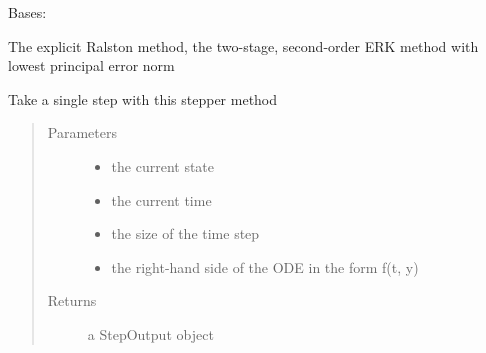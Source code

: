\documentclass[letterpaper,10pt,english]{sphinxmanual}
\begin{document}

\begin{fulllineitems}
\label{\detokenize{spitfire.time.methods:spitfire.time.methods.ExplicitRungeKutta2Ralston}}
Bases: {\hyperref[\detokenize{spitfire.time.methods:spitfire.time.methods.ExplicitRungeKutta}]{}}

The explicit Ralston method, the two-stage, second-order ERK method with lowest principal error norm

\begin{fulllineitems}
\label{\detokenize{spitfire.time.methods:spitfire.time.methods.ExplicitRungeKutta2Ralston.single_step}}
Take a single step with this stepper method
\begin{quote}\begin{description}
\item[{Parameters}] \leavevmode\begin{itemize}
\item {} 
 \textendash{} the current state

\item {} 
 \textendash{} the current time

\item {} 
 \textendash{} the size of the time step

\item {} 
 \textendash{} the right-hand side of the ODE in the form f(t, y)

\end{itemize}

\item[{Returns}] \leavevmode
a StepOutput object

\end{description}\end{quote}

\end{fulllineitems}


\end{fulllineitems}
\end{document}
